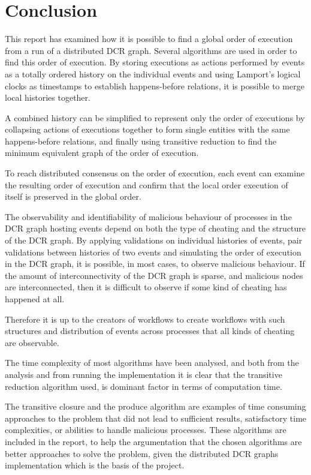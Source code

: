 \chapter*{Conclusion}
This report has examined how it is possible to find a global order of execution from a run of a distributed DCR graph. Several algorithms are used in order to find this order of execution. By storing executions as actions performed by events as a totally ordered history on the individual events and using Lamport's logical clocks as timestamps to establish happens-before relations, it is possible to merge local histories together.

A combined history can be simplified to represent only the order of executions by collapsing actions of executions together to form single entities with the same happens-before relations, and finally using transitive reduction to find the minimum equivalent graph of the order of execution.

To reach distributed consensus on the order of execution, each event can examine the resulting order of execution and confirm that the local order execution of itself is preserved in the global order.

The observability and identifiability of malicious behaviour of processes in the DCR graph hosting events depend on both the type of cheating and the structure of the DCR graph. By applying validations on individual histories of events, pair validations between histories of two events and simulating the order of execution in the DCR graph, it is possible, in most cases, to observe malicious behaviour. If the amount of interconnectivity of the DCR graph is sparse, and malicious nodes are interconnected, then it is difficult to observe if some kind of cheating has happened at all.

Therefore it is up to the creators of workflows to create workflows with such structures and distribution of events across processes that all kinds of cheating are observable.

\newpar The time complexity of most algorithms have been analysed, and both from the analysis and from running the implementation it is clear that the transitive reduction algorithm used, is dominant factor in terms of computation time.

\newpar The transitive closure and the produce algorithm are examples of time consuming approaches to the problem that did not lead to sufficient results, satisfactory time complexities, or abilities to handle malicious processes. These algorithms are included in the report, to help the argumentation that the chosen algorithms are better approaches to solve the problem, given the distributed DCR graphs implementation which is the basis of the project.

